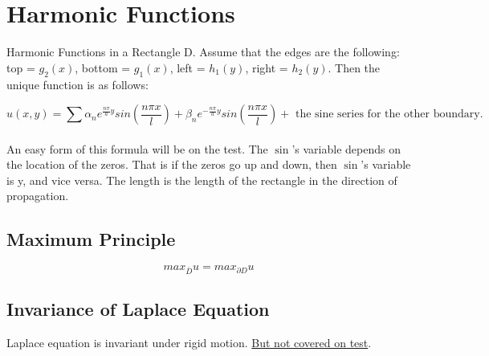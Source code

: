 \documentclass{article}
\begin{document}
\section*{Harmonic Functions}

Harmonic Functions in a Rectangle D. Assume that the edges are the following: top = $g_2(x)$, bottom = $g_1(x)$, left = $h_1(y)$, right = $h_2(y)$.
Then the unique function is as follows:

\begin{equation}
    u(x,y) = \sum_{}^{}\alpha_n e^{\frac{n\pi}{a}y}sin(\frac{n\pi x}{l}) + \beta_n e^{-\frac{n\pi}{a}y}sin(\frac{n\pi x}{l}) + \textrm{ the sine series for the other boundary. }
\end{equation}

An easy form of this formula will be on the test. The $\sin$'s variable depends on the location of the zeros. That is if the zeros go up and down, then $\sin$'s variable is y, and vice versa.
The length is the length of the rectangle in the direction of propagation.

\subsection*{Maximum Principle}

\begin{equation}
    max_{\bar{D}}u = max_{\partial D}u
\end{equation}

\subsection*{Invariance of Laplace Equation}

Laplace equation is invariant under rigid motion. \underline{But not covered on test}. 
\end{document}
